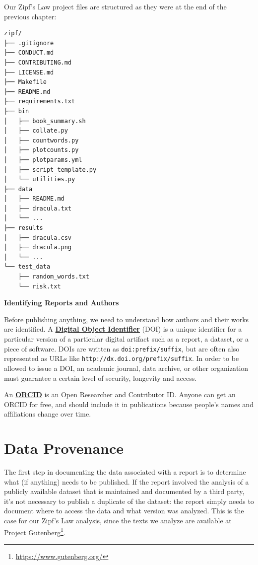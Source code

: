 \documentclass[
]{krantz}
\renewenvironment{quote}{\begin{VF}}{\end{VF}}
\renewcommand{\href}[2]{#2\footnote{\url{#1}}}
\newcommand{\gref}[2]{\hyperlink{#2}{\textbf{#1}}}
\begin{document}
Our Zipf's Law project files are structured as they were at the end of the previous chapter:

\begin{verbatim}
zipf/
├── .gitignore
├── CONDUCT.md
├── CONTRIBUTING.md
├── LICENSE.md
├── Makefile
├── README.md
├── requirements.txt
├── bin
│   ├── book_summary.sh
│   ├── collate.py
│   ├── countwords.py
│   ├── plotcounts.py
│   ├── plotparams.yml
│   ├── script_template.py
│   └── utilities.py
├── data
│   ├── README.md
│   ├── dracula.txt
│   └── ...
├── results
│   ├── dracula.csv
│   ├── dracula.png
│   └── ...
└── test_data
    ├── random_words.txt
    └── risk.txt
\end{verbatim}

\begin{quote}
\textbf{Identifying Reports and Authors}

Before publishing anything,
we need to understand how authors and their works are identified.
A \gref{Digital Object Identifier}{doi} (DOI)
is a unique identifier for a particular version of a particular digital artifact
such as a report, a dataset, or a piece of software.
DOIs are written as \texttt{doi:prefix/suffix},
but are often also represented as URLs like \texttt{http://dx.doi.org/prefix/suffix}.
In order to be allowed to issue a DOI,
an academic journal, data archive, or other organization
must guarantee a certain level of security, longevity and access.

An \gref{ORCID}{orcid}
is an Open Researcher and Contributor ID.
Anyone can get an ORCID for free,
and should include it in publications
because people's names and affiliations change over time.
\end{quote}

\hypertarget{provenance-data}{%
\section{Data Provenance}\label{provenance-data}}

The first step in documenting the data associated with a report
is to determine what (if anything) needs to be published.
If the report involved the analysis of a publicly available dataset
that is maintained and documented by a third party,
it's not necessary to publish a duplicate of the dataset:
the report simply needs to document where to access the data
and what version was analyzed.
This is the case for our Zipf's Law analysis,
since the texts we analyze are available at \href{https://www.gutenberg.org/}{Project Gutenberg}.
\end{document}
